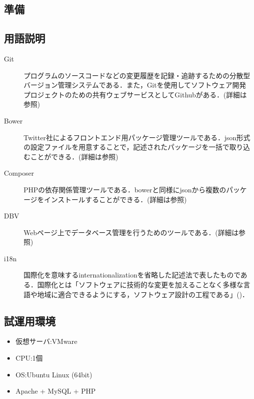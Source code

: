 \documentclass[a4paper]{jarticle}
\begin{document}
\begin{multicols}{2}

\section{準備}

\subsection{用語説明}
\begin{description}
\item[Git]プログラムのソースコードなどの変更履歴を記録・追跡するための分散型バージョン管理システムである．また，Gitを使用してソフトウェア開発プロジェクトのための共有ウェブサービスとしてGithubがある．(詳細は\cite{git}参照)
\end{description}

\begin{description}
\item[Bower]Twitter社によるフロントエンド用パッケージ管理ツールである．json形式の設定ファイルを用意することで，記述されたパッケージを一括で取り込むことができる．(詳細は\cite{bower}参照)
\end{description}

\begin{description}
\item[Composer] PHPの依存関係管理ツールである．bowerと同様にjsonから複数のパッケージをインストールすることができる．(詳細は\cite{composer}参照)

\end{description}

\begin{description}
\item[DBV]  Webページ上でデータベース管理を行うためのツールである．(詳細は\cite{dbv}参照)
\end{description}

\begin{description}
\item[i18n] 国際化を意味するinternationalizationを省略した記述法で表したものである．国際化とは「ソフトウェアに技術的な変更を加えることなく多様な言語や地域に適合できるようにする，ソフトウェア設計の工程である」(\cite{i18n})．
\end{description}

\subsection{試運用環境}
\begin{itemize}
\item 仮想サーバ:VMware
\item CPU:1個
\item OS:Ubuntu Linux (64bit)
\item Apache + MySQL + PHP
\end{itemize}


\end{multicols}
\end{document}
